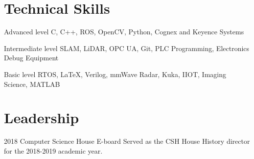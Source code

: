 \documentclass{tccv}
\begin{document}
\section{Technical Skills}
\begin{factlist}

\item{Advanced  level}
     {C, C++, ROS, OpenCV, Python, Cognex and Keyence Systems}

\item{Intermediate level}
     {SLAM, LiDAR, OPC UA, Git, PLC Programming, Electronics Debug Equipment}

\item{Basic level}
     {RTOS, \LaTeX, Verilog, mmWave Radar, Kuka, IIOT, Imaging Science, MATLAB}

\end{factlist}

\section{Leadership}
\begin{yearlist}

\item{2018}
     {Computer Science House E-board}
     {Served as the CSH House History director for the 2018-2019 academic year.}

\end{yearlist}
\end{document}
